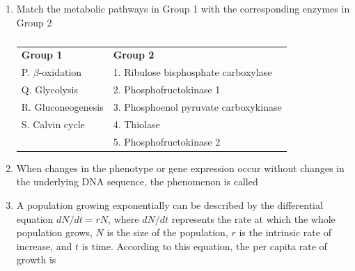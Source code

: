 \documentclass[journal,12pt,onecolumn]{IEEEtran}
\theoremstyle{remark}
\begin{document}
\begin{enumerate}
\item Match the metabolic pathways in Group 1 with the corresponding enzymes in Group 2 
\hfill{}

\begin{table}[h]
\centering
\begin{tabular}{ll}
\textbf{Group 1} & \textbf{Group 2} \\
P. $\beta$-oxidation & 1. Ribulose bisphosphate carboxylase \\
Q. Glycolysis & 2. Phosphofructokinase 1 \\
R. Gluconeogenesis & 3. Phosphoenol pyruvate carboxykinase \\
S. Calvin cycle & 4. Thiolase \\
 & 5. Phosphofructokinase 2 \\
\end{tabular}
\caption*{}
\label{tab:q20}
\end{table}

\begin{enumerate}
\end{enumerate}

\item When changes in the phenotype or gene expression occur without changes in the underlying DNA sequence, the phenomenon is called 
\hfill{}

\begin{enumerate}
\end{enumerate}

\item A population growing exponentially can be described by the differential equation $dN/dt = rN$, where $dN/dt$ represents the rate at which the whole population grows, $N$ is the size of the population, $r$ is the intrinsic rate of increase, and $t$ is time. According to this equation, the per capita rate of growth is 
\hfill{}


\end{enumerate}
\end{document}
